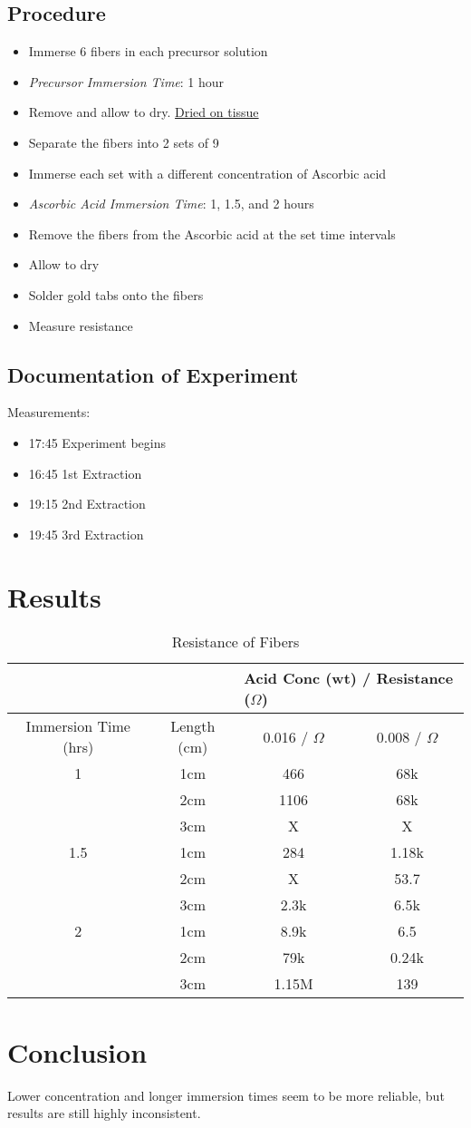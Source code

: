 \documentclass{article}
\begin{document}
\subsection{Procedure}
\begin{itemize}
    \item Immerse 6 fibers in each precursor solution
    \item \textit{Precursor Immersion Time}: 1 hour
    \item Remove and allow to dry. \underline{Dried on tissue}
    \item Separate the fibers into 2 sets of 9
    \item Immerse each set with a different concentration of Ascorbic acid
    \item \textit{Ascorbic Acid Immersion Time}: 1, 1.5, and 2 hours
    \item Remove the fibers from the Ascorbic acid at the set time intervals 
    \item Allow to dry
    \item Solder gold tabs onto the fibers
    \item Measure resistance
\end{itemize}

\subsection{Documentation of Experiment}
Measurements:
\begin{itemize}
    \item 17:45 Experiment begins 
    \item 16:45 1st Extraction 
    \item 19:15 2nd Extraction 
    \item 19:45 3rd Extraction 
\end{itemize}

\section{Results}
\begin{table}[h!]
\centering
\begin{tabular}{ |c|c|c|c| } 
 \hline
&&\multicolumn{2}{l|}{Acid Conc (wt) / Resistance ($\Omega$)} \\ \hline
Immersion Time (hrs)&Length (cm) & 0.016 / $\Omega$ & 0.008 / $\Omega$ \\ 
 \hline
 1 & 1cm & 466  & 68k\\ 
 & 2cm & 1106 & 68k\\ 
 & 3cm & X & X\\ 
 \hline
1.5 & 1cm & 284 & 1.18k\\ 
& 2cm & X & 53.7\\ 
& 3cm & 2.3k & 6.5k\\ 
\hline
2 & 1cm & 8.9k & 6.5\\ 
& 2cm & 79k & 0.24k\\ 
& 3cm & 1.15M & 139\\ 
 \hline
\end{tabular}
 \caption{Resistance of Fibers}
\label{table:1}
\end{table}

\section{Conclusion}
Lower concentration and longer immersion times seem to be more reliable, but results are still highly inconsistent.
\end{document}
